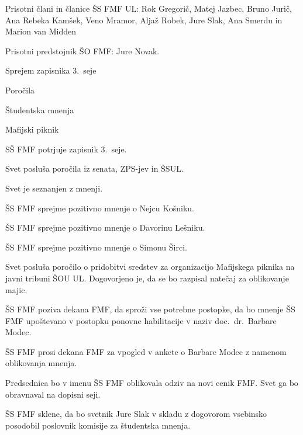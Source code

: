 \documentclass{seja}
\begin{document}
Prisotni člani in članice ŠS FMF UL:  Rok Gregorič, Matej Jazbec, Bruno Jurič,
Ana Rebeka Kamšek, Veno Mramor, Aljaž Robek, Jure Slak, Ana Smerdu in Marion van
Midden

Prisotni predstojnik ŠO FMF: Jure Novak.

\begin{red*}
\item Sprejem zapisnika 3.~seje
\item Poročila
\item Študentska mnenja
\item Mafijski piknik
\end{red*}

\begin{ad}
\item
\begin{sklep*}
  SŠ FMF potrjuje zapisnik 3.~seje.
\end{sklep*}

\item Svet posluša poročila iz senata, ZPS-jev in ŠSUL.
\item Svet je seznanjen z mnenji.

\begin{sklep*}
  ŠS FMF sprejme pozitivno mnenje o Nejcu Košniku.
\end{sklep*}

\begin{sklep*}
  ŠS FMF sprejme pozitivno mnenje o Davorinu Lešniku.
\end{sklep*}

\begin{sklep*}
  ŠS FMF sprejme pozitivno mnenje o Simonu Širci.
\end{sklep*}

\item Svet posluša poročilo o pridobitvi sredstev za organizacijo Mafijskega
piknika na javni tribuni ŠOU UL. Dogovorjeno je, da se bo razpisal natečaj za
oblikovanje majic.

\item
\begin{sklep}
  ŠS FMF poziva dekana FMF, da sproži vse potrebne postopke, da bo mnenje ŠS FMF
  upoštevano v postopku ponovne habilitacije v naziv doc.\ dr.\ Barbare Modec.
\end{sklep}

\begin{sklep*}
  ŠS FMF prosi dekana FMF za vpogled v ankete o Barbare Modec z namenom
  oblikovanja mnenja.
\end{sklep*}

\begin{sklep*}
  Predsednica bo v imenu ŠS FMF oblikovala  odziv na novi cenik FMF. Svet ga bo
  obravnaval na dopisni seji.
\end{sklep*}

\begin{sklep*}
  ŠS FMF sklene, da bo svetnik Jure Slak v skladu z dogovorom vsebinsko posodobil
  poslovnik komisije za študentska mnenja.
\end{sklep*}
\end{ad}
\end{document}
